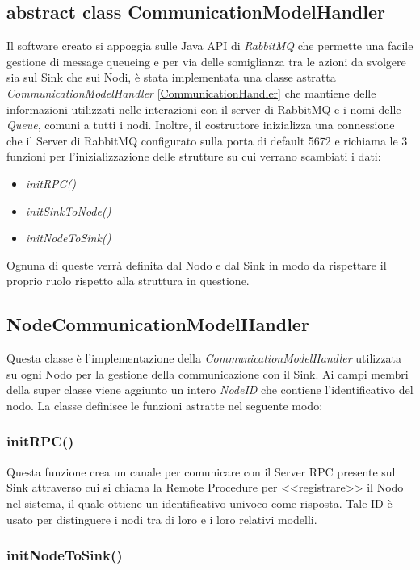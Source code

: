     \subsection{abstract class CommunicationModelHandler}
      Il software creato si appoggia sulle Java API di \textit{RabbitMQ} che permette una facile gestione di message queueing e per via delle somiglianza tra le azioni da svolgere sia sul Sink che sui Nodi, è stata implementata una classe astratta \textit{CommunicationModelHandler} \ref{CommunicationHandler} che mantiene delle informazioni utilizzati nelle interazioni con il server di RabbitMQ e i nomi delle \textit{Queue}, comuni a tutti i nodi. Inoltre, il costruttore inizializza una connessione che il Server di RabbitMQ configurato sulla porta di default 5672 e richiama le 3 funzioni per l'inizializzazione delle strutture su cui verrano scambiati i dati:
      \begin{itemize}
        \item \textit{initRPC()}
        \item \textit{initSinkToNode()}
        \item \textit{initNodeToSink()}
      \end{itemize}
      Ognuna di queste verrà definita dal Nodo e dal Sink in modo da rispettare il proprio ruolo rispetto alla struttura in questione.
      

    \subsection{NodeCommunicationModelHandler}
      Questa classe è l'implementazione della \textit{CommunicationModelHandler} utilizzata su ogni Nodo per la gestione della communicazione con il Sink. Ai campi membri della super classe viene aggiunto un intero \textit{NodeID} che contiene l'identificativo del nodo. La classe definisce le funzioni astratte nel seguente modo:
      \subsubsection{initRPC()}
        Questa funzione crea un canale per comunicare con il Server RPC presente sul Sink attraverso cui si chiama la Remote Procedure per <<registrare>> il Nodo nel sistema, il quale ottiene un identificativo univoco come risposta. Tale ID è usato per distinguere i nodi tra di loro e i loro relativi modelli.
        

      \subsubsection{initNodeToSink()}
